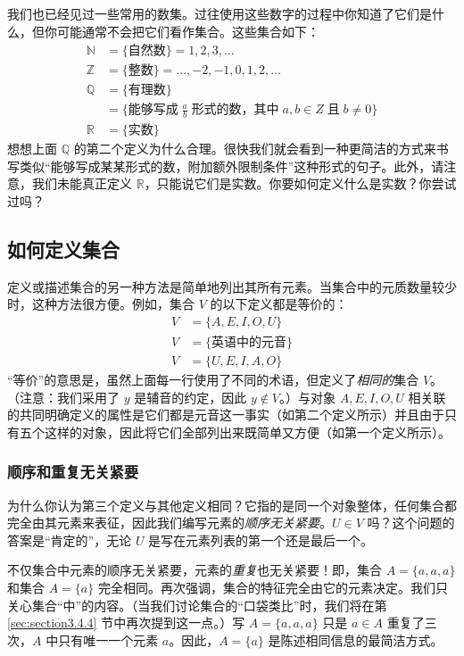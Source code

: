 我们也已经见过一些常用的数集。过往使用这些数字的过程中你知道了它们是什么，但你可能通常不会把它们看作集合。这些集合如下：
\begin{align*}
    \mathbb{N} &= \{ \text{自然数} \} = {1, 2, 3, \dots}\\
    \mathbb{Z} &= \{ \text{整数} \} = {\dots , -2, -1, 0, 1, 2, \dots}\\
    \mathbb{Q} &= \{ \text{有理数} \}\\
      &= \{ \text{能够写成}\; \frac{a}{b} \;\text{形式的数，其中}\; a, b \in Z \;\text{且}\; b \ne 0 \}\\
      \mathbb{R} &= \{ \text{实数}\}
\end{align*}
想想上面 $\mathbb{Q}$ 的第二个定义为什么合理。很快我们就会看到一种更简洁的方式来书写类似``能够写成某某形式的数，附加额外限制条件''这种形式的句子。此外，请注意，我们未能真正定义 $\mathbb{R}$，只能说它们是实数。你要如何定义什么是实数？你尝试过吗？

\subsection{如何定义集合}

定义或描述集合的另一种方法是简单地列出其所有元素。当集合中的元质数量较少时，这种方法很方便。例如，集合 $V$ 的以下定义都是等价的：
\begin{align*}
    V &= \{A,E,I,O,U\}\\
    V &= \{\text{英语中的元音}\}\\
    V &= \{U,E,I,A,O\}
\end{align*}
``等价''的意思是，虽然上面每一行使用了不同的术语，但定义了\emph{相同的}集合 $V$。（注意：我们采用了 $y$ 是辅音的约定，因此 $y \notin V$。）与对象 $A, E, I, O, U$ 相关联的共同明确定义的属性是它们都是元音这一事实（如第二个定义所示）并且由于只有五个这样的对象，因此将它们全部列出来既简单又方便（如第一个定义所示）。

\subsubsection*{顺序和重复无关紧要}

为什么你认为第三个定义与其他定义相同？它指的是同一个对象整体，任何集合都完全由其元素来表征，因此我们编写元素的\emph{顺序无关紧要}。$U \in V$ 吗？这个问题的答案是``肯定的''，无论 $U$ 是写在元素列表的第一个还是最后一个。

不仅集合中元素的顺序无关紧要，元素的\emph{重复}也无关紧要！即，集合 $A=\{a,a,a\}$ 和集合 $A=\{a\}$ 完全相同。再次强调，集合的特征完全由它的元素决定。我们只关心集合``中''的内容。（当我们讨论集合的``口袋类比''时，我们将在第 \ref{sec:section3.4.4} 节中再次提到这一点。）写 $A = \{a, a, a\}$ 只是 $a \in A$ 重复了三次，$A$ 中只有唯一一个元素 $a$。因此，$A = \{a\}$ 是陈述相同信息的最简洁方式。

